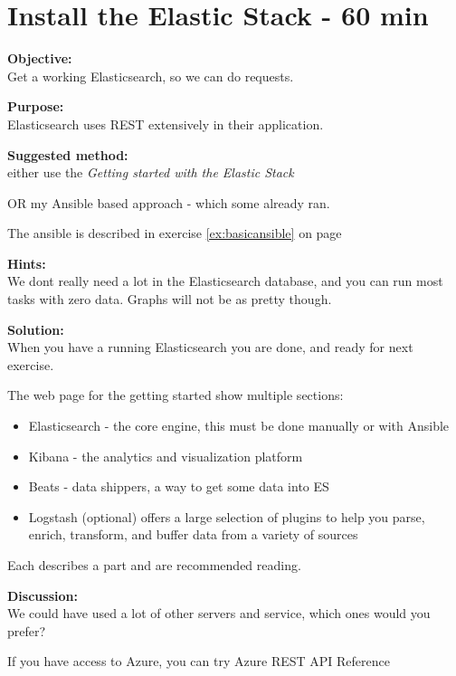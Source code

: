 \documentclass[a4paper,11pt,notitlepage]{report}
\begin{document}
\chapter{Install the Elastic Stack - 60 min}
\label{instalelastic}



{\bf Objective:}\\
Get a working Elasticsearch, so we can do requests.

{\bf Purpose:}\\
Elasticsearch uses REST extensively in their application.

{\bf Suggested method:}\\
either use the
\emph{Getting started with the Elastic Stack}

OR my Ansible based approach - which some already ran.

The ansible is described in exercise \ref{ex:basicansible} on page \pageref{ex:basicansible}

{\bf Hints:}\\
We dont really need a lot in the Elasticsearch database, and you can run most tasks with zero data. Graphs will not be as pretty though.

{\bf Solution:}\\
When you have a running Elasticsearch you are done, and ready for next exercise.

The web page for the getting started show multiple sections:
\begin{itemize}
\item Elasticsearch - the core engine, this must be done manually or with Ansible
\item Kibana - the analytics and visualization platform
\item Beats - data shippers, a way to get some data into ES
\item Logstash (optional) offers a large selection of plugins to help you parse, enrich, transform, and buffer data from a variety of sources
\end{itemize}

Each describes a part and are recommended reading.

{\bf Discussion:}\\
We could have used a lot of other servers and service, which ones would you prefer?

If you have access to Azure, you can try Azure REST API Reference\\ 
\end{document}
